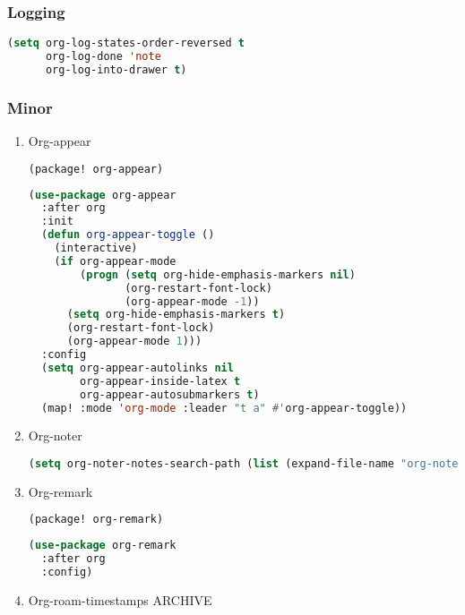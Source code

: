 \documentclass[11pt]{article}
\begin{document}
\subsubsection{Logging}
\label{sec:logging}
\begin{lstlisting}[language=Lisp]
(setq org-log-states-order-reversed t
      org-log-done 'note
      org-log-into-drawer t)
\end{lstlisting}

\subsubsection{Minor}
\label{sec:minor}


\begin{enumerate}
  \item Org-appear
  \label{sec:org-appear}

  \begin{lstlisting}[language=Lisp]
(package! org-appear)
\end{lstlisting}

\begin{lstlisting}[language=Lisp]
(use-package org-appear
  :after org
  :init
  (defun org-appear-toggle ()
    (interactive)
    (if org-appear-mode
        (progn (setq org-hide-emphasis-markers nil)
               (org-restart-font-lock)
               (org-appear-mode -1))
      (setq org-hide-emphasis-markers t)
      (org-restart-font-lock)
      (org-appear-mode 1)))
  :config
  (setq org-appear-autolinks nil
        org-appear-inside-latex t
        org-appear-autosubmarkers t)
  (map! :mode 'org-mode :leader "t a" #'org-appear-toggle))
\end{lstlisting}
  \item Org-noter
  \label{sec:org-noter}

  \begin{lstlisting}[language=Lisp]
(setq org-noter-notes-search-path (list (expand-file-name "org-noter" org-roam-directory)))
\end{lstlisting}
  \item Org-remark
  \label{sec:org-remark}

  \begin{lstlisting}[language=Lisp]
(package! org-remark)
\end{lstlisting}

\begin{lstlisting}[language=Lisp]
(use-package org-remark
  :after org
  :config)
\end{lstlisting}
  \item Org-roam-timestamps\hfill{} ARCHIVE
  \label{sec:org-roam-timestamps}


\end{enumerate}
\end{document}
